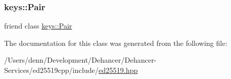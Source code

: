 \subsubsection{\texorpdfstring{keys\+::\+Pair}{keys::Pair}}
{\footnotesize\ttfamily friend class \mbox{\hyperlink{classed25519_1_1keys_1_1_pair}{keys\+::\+Pair}}\hspace{0.3cm}{\ttfamily [friend]}}



The documentation for this class was generated from the following file\+:\begin{DoxyCompactItemize}
\item 
/\+Users/denn/\+Development/\+Dehancer/\+Dehancer-\/\+Services/ed25519cpp/include/\mbox{\hyperlink{ed25519_8hpp}{ed25519.\+hpp}}\end{DoxyCompactItemize}
